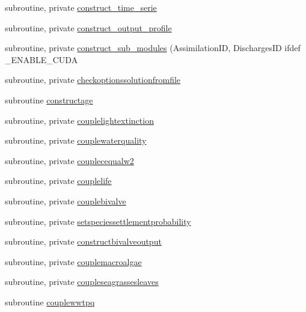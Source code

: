 \begin{DoxyCompactItemize}
\item 
subroutine, private \mbox{\hyperlink{namespacemodulewaterproperties_a0067cb435852460b42999329f0637ab7}{construct\+\_\+time\+\_\+serie}}
\item 
subroutine, private \mbox{\hyperlink{namespacemodulewaterproperties_a0df2c60cf00ccbb52f0db0aa65924c93}{construct\+\_\+output\+\_\+profile}}
\item 
subroutine, private \mbox{\hyperlink{namespacemodulewaterproperties_aef459b24af9c748df5b5fb96dc4292bb}{construct\+\_\+sub\+\_\+modules}} (Assimilation\+ID, Discharges\+ID ifdef \+\_\+\+E\+N\+A\+B\+L\+E\+\_\+\+C\+U\+DA
\item 
subroutine, private \mbox{\hyperlink{namespacemodulewaterproperties_a57c8ab92e75b6233d379f6d614bdd148}{checkoptionssolutionfromfile}}
\item 
subroutine \mbox{\hyperlink{namespacemodulewaterproperties_ad670c20ce44d68b70fd32aa550c904db}{constructage}}
\item 
subroutine, private \mbox{\hyperlink{namespacemodulewaterproperties_a26a4b3541362ed971440672979e6fedb}{couplelightextinction}}
\item 
subroutine, private \mbox{\hyperlink{namespacemodulewaterproperties_a2f489eed4fdde73d4aa3ecc3ac0f1ced}{couplewaterquality}}
\item 
subroutine, private \mbox{\hyperlink{namespacemodulewaterproperties_a7478a221b172ba61186f09416e5b3b0d}{couplecequalw2}}
\item 
subroutine, private \mbox{\hyperlink{namespacemodulewaterproperties_a2568e97ada2e06111796b52ea4b7c50a}{couplelife}}
\item 
subroutine, private \mbox{\hyperlink{namespacemodulewaterproperties_ab7e6de4d55639d85393ee68b800ba784}{couplebivalve}}
\item 
subroutine, private \mbox{\hyperlink{namespacemodulewaterproperties_a634883e39ff4b721f62c2324303fa3c4}{setspeciessettlementprobability}}
\item 
subroutine, private \mbox{\hyperlink{namespacemodulewaterproperties_abe78da28c4264216e9c5f3d2e8a558f4}{constructbivalveoutput}}
\item 
subroutine, private \mbox{\hyperlink{namespacemodulewaterproperties_a2eeb2f2e0e29e2293f16af83dcbe02bb}{couplemacroalgae}}
\item 
subroutine, private \mbox{\hyperlink{namespacemodulewaterproperties_ad4fbcdc5c8f0cd8982dbe65a88f54ab8}{coupleseagrassesleaves}}
\item 
subroutine \mbox{\hyperlink{namespacemodulewaterproperties_a2c86f539e4715abad89dc127b5f17d20}{couplewwtpq}}

\end{DoxyCompactItemize}
